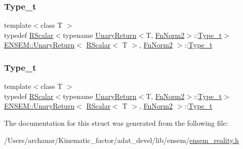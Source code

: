 \subsubsection{\texorpdfstring{Type\_t}{Type\_t}\hspace{0.1cm}{\footnotesize\ttfamily [1/2]}}
{\footnotesize\ttfamily template$<$class T $>$ \\
typedef \mbox{\hyperlink{classENSEM_1_1RScalar}{R\+Scalar}}$<$typename \mbox{\hyperlink{structENSEM_1_1UnaryReturn}{Unary\+Return}}$<$T, \mbox{\hyperlink{structENSEM_1_1FnNorm2}{Fn\+Norm2}}$>$\+::\mbox{\hyperlink{structENSEM_1_1UnaryReturn_3_01RScalar_3_01T_01_4_00_01FnNorm2_01_4_a0b95acf355311a4c109012c267496961}{Type\+\_\+t}}$>$ \mbox{\hyperlink{structENSEM_1_1UnaryReturn}{E\+N\+S\+E\+M\+::\+Unary\+Return}}$<$ \mbox{\hyperlink{classENSEM_1_1RScalar}{R\+Scalar}}$<$ T $>$, \mbox{\hyperlink{structENSEM_1_1FnNorm2}{Fn\+Norm2}} $>$\+::\mbox{\hyperlink{structENSEM_1_1UnaryReturn_3_01RScalar_3_01T_01_4_00_01FnNorm2_01_4_a0b95acf355311a4c109012c267496961}{Type\+\_\+t}}}

\mbox{\label{structENSEM_1_1UnaryReturn_3_01RScalar_3_01T_01_4_00_01FnNorm2_01_4_a0b95acf355311a4c109012c267496961}} 
\subsubsection{\texorpdfstring{Type\_t}{Type\_t}\hspace{0.1cm}{\footnotesize\ttfamily [2/2]}}
{\footnotesize\ttfamily template$<$class T $>$ \\
typedef \mbox{\hyperlink{classENSEM_1_1RScalar}{R\+Scalar}}$<$typename \mbox{\hyperlink{structENSEM_1_1UnaryReturn}{Unary\+Return}}$<$T, \mbox{\hyperlink{structENSEM_1_1FnNorm2}{Fn\+Norm2}}$>$\+::\mbox{\hyperlink{structENSEM_1_1UnaryReturn_3_01RScalar_3_01T_01_4_00_01FnNorm2_01_4_a0b95acf355311a4c109012c267496961}{Type\+\_\+t}}$>$ \mbox{\hyperlink{structENSEM_1_1UnaryReturn}{E\+N\+S\+E\+M\+::\+Unary\+Return}}$<$ \mbox{\hyperlink{classENSEM_1_1RScalar}{R\+Scalar}}$<$ T $>$, \mbox{\hyperlink{structENSEM_1_1FnNorm2}{Fn\+Norm2}} $>$\+::\mbox{\hyperlink{structENSEM_1_1UnaryReturn_3_01RScalar_3_01T_01_4_00_01FnNorm2_01_4_a0b95acf355311a4c109012c267496961}{Type\+\_\+t}}}



The documentation for this struct was generated from the following file\+:\begin{DoxyCompactItemize}
\item 
/\+Users/archanar/\+Kinematic\+\_\+factor/adat\+\_\+devel/lib/ensem/\mbox{\hyperlink{lib_2ensem_2ensem__reality_8h}{ensem\+\_\+reality.\+h}}\end{DoxyCompactItemize}
